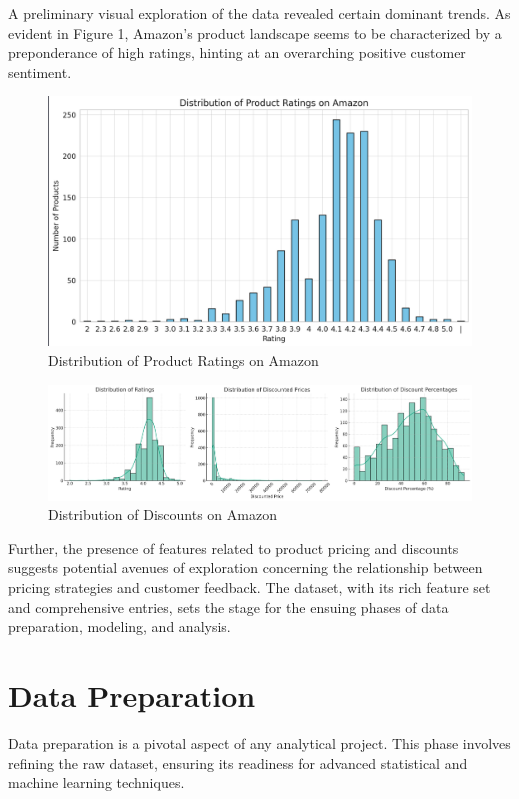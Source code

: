 \documentclass[12pt]{article}
\begin{document}
A preliminary visual exploration of the data revealed certain dominant trends. As evident in Figure 1, Amazon's product landscape seems to be characterized by a preponderance of high ratings, hinting at an overarching positive customer sentiment.

\begin{figure}[H]
    \centering
    \includegraphics[width=0.7\linewidth]{rating_distribution.png}
    \caption{Distribution of Product Ratings on Amazon}
    \label{fig:rating_distribution}
\end{figure}

\begin{figure}[H]
    \centering
    \includegraphics[width=0.7\linewidth]{discount_distribution.png}
    \caption{Distribution of Discounts on Amazon}
    \label{fig:discount_distribution}
\end{figure}

Further, the presence of features related to product pricing and discounts suggests potential avenues of exploration concerning the relationship between pricing strategies and customer feedback. The dataset, with its rich feature set and comprehensive entries, sets the stage for the ensuing phases of data preparation, modeling, and analysis.



\section{Data Preparation}

Data preparation is a pivotal aspect of any analytical project. This phase involves refining the raw dataset, ensuring its readiness for advanced statistical and machine learning techniques.
\end{document}
